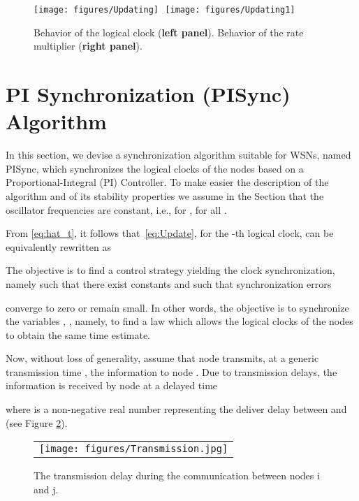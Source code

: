 \documentclass[english,a4paper,10pt,final]{article}
\numberwithin{equation}{section}
\numberwithin{figure}{section}
\begin{document}
\begin{figure}[!t]
\centering
\texttt{[image: figures/Updating]}\,\,\,\,\texttt{[image: figures/Updating1]}
\caption{Behavior of the logical clock  ({\bf left panel}). Behavior of the rate multiplier  ({\bf right panel}).
}
\label{fig:Updating}
\end{figure}


\section{PI Synchronization (PISync) Algorithm }
\label{sec:PI}

In this section, we devise a synchronization algorithm suitable for WSNs, named PISync, which synchronizes the logical clocks of the nodes based on a Proportional-Integral (PI) Controller. 
To make easier the description of the algorithm and of its stability properties we assume in the Section that the oscillator frequencies  are constant, i.e., for ,  for all . 

\vspace{0.1cm}

From \eqref{eq:hat_t}, it follows that~\eqref{eq:Update}, for the -th logical clock, can be equivalently rewritten as

 
 The objective is to find a control strategy yielding the clock synchronization, namely such that there exist constants  and  such that synchronization errors 

converge  to zero or remain small. In other words, the objective is to synchronize the variables , , namely, to find a law which allows the logical clocks of the nodes to obtain the same time estimate.

Now, without loss of generality, assume that node  transmits, at a generic transmission time , the information  to node . Due to transmission delays, 
the information  is received by node  at a delayed time

where  is a non-negative real number representing the deliver delay between  and  (see Figure \ref{fig:tx}).

\begin{figure}
\begin{center}
\begin{tabular}{c}
\texttt{[image: figures/Transmission.jpg]}
\end{tabular}
\caption{\label{fig:tx}The transmission delay during the communication between nodes i and j.}
\end{center}
\end{figure}
\end{document}
